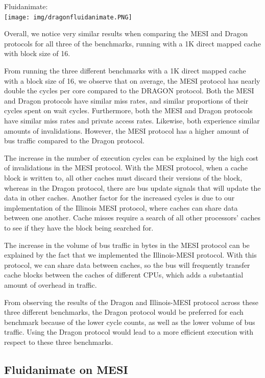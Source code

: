 \documentclass{article}
\begin{document}
Fluidanimate:\\
\texttt{[image: img/dragonfluidanimate.PNG]}

Overall, we notice very similar results when comparing the MESI and Dragon protocols for all three of the benchmarks, running with a 1K direct mapped cache with block size of 16.

From running the three different benchmarks with a 1K direct mapped cache with a block size of 16, we observe that on average, the MESI protocol has nearly double the cycles per core compared to the DRAGON protocol. Both the MESI and Dragon protocols have similar miss rates, and similar proportions of their cycles spent on wait cycles. Furthermore, both the MESI and Dragon protocols have similar miss rates and private access rates. Likewise, both experience similar amounts of invalidations. However, the MESI protocol has a higher amount of bus traffic compared to the Dragon protocol.

The increase in the number of execution cycles can be explained by the high cost of invalidations in the MESI protocol. With the MESI protocol, when a cache block is written to, all other caches must discard their versions of the block, whereas in the Dragon protocol, there are bus update signals that will update the data in other caches. Another factor for the increased cycles is due to our implementation of the Illinois MESI protocol, where caches can share data between one another. Cache misses require a search of all other processors' caches to see if they have the block being searched for.

The increase in the volume of bus traffic in bytes in the MESI protocol can be explained by the fact that we implemented the Illinois-MESI protocol. With this protocol, we can share data between caches, so the bus will frequently transfer cache blocks between the caches of different CPUs, which adds a substantial amount of overhead in traffic.

From observing the results of the Dragon and Illinois-MESI protocol across these three different benchmarks, the Dragon protocol would be preferred for each benchmark because of the lower cycle counts, as well as the lower volume of bus traffic. Using the Dragon protocol would lead to a more efficient execution with respect to these three benchmarks.

\subsection{Fluidanimate on MESI}
\end{document}
